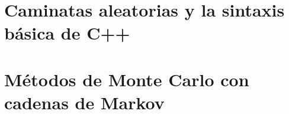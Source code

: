 \documentclass[10pt,twoside,openany, letterpaper]{book}
\begin{document}
% 
% 
% 
% 
% 
% 
% 
% 
% 
% 
% 



\part{Caminatas aleatorias y la sintaxis básica de C++}






\part{Métodos de Monte Carlo con cadenas de Markov}



%

\end{document}
